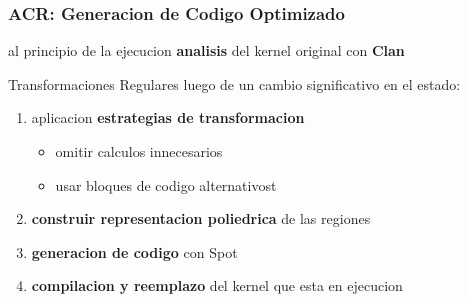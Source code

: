 \documentclass{beamer}\usetheme{Madrid} %
\begin{document}
\begin{frame}
\frametitle{ACR: Generacion de Codigo Optimizado}
\begin{block}{al principio de la ejecucion}
\textbf{analisis} del kernel original con \textbf{Clan}
\end{block}
\begin{block}{Transformaciones Regulares}
luego de un cambio significativo en el estado:
\begin{enumerate}
\item aplicacion \textbf{estrategias de transformacion}
\begin{itemize}
	\item omitir calculos innecesarios
	\item usar bloques de codigo alternativost
\end{itemize}
\item \textbf{construir representacion poliedrica} de las regiones
\item \textbf{generacion de codigo} con Spot
\item \textbf{compilacion y reemplazo} del kernel que esta en ejecucion
\end{enumerate}
\end{block}
\end{frame}
\end{document}
